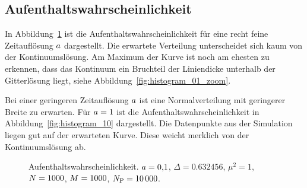 \subsection{Aufenthaltswahrscheinlichkeit}


In Abbildung~\ref{fig:histogram_01} ist die Aufenthaltswahrscheinlichkeit für
eine recht feine Zeitauflösung $a$ dargestellt. Die erwartete
Verteilung unterscheidet sich kaum von der Kontinuumslösung. Am Maximum der
Kurve ist noch am ehesten zu erkennen, dass das Kontinuum ein Bruchteil der
Liniendicke unterhalb der Gitterlösung liegt, siehe
Abbildung~\ref{fig:histogram_01_zoom}.

Bei einer geringeren Zeitauflösung $a$ ist eine Normalverteilung mit
geringerer Breite zu erwarten. Für $a = \num{1}$ ist die
Aufenthaltswahrscheinlichkeit in Abbildung~\ref{fig:histogram_10} dargestellt.
Die Datenpunkte aus der Simulation liegen gut auf der erwarteten Kurve. Diese
weicht merklich von der Kontinuumslösung ab.

\begin{figure}[htbp]
    \centering
    \caption{%
        Aufenthaltswahrscheinlichkeit. $a =
        \num{0.1}$, $\Delta = \num{0.632456}$, $\mu^2 = \num{1}$, $N =
        \num{1000}$, $M = \num{1000}$, $N_\text P = \num{10000}$.
    }
    \label{fig:histogram_01}
\end{figure}

